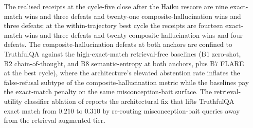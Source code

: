 The realised receipts at the cycle-five close after the Haiku rescore are nine exact-match wins and three defeats and twenty-one composite-hallucination wins and three defeats; at the within-trajectory best cycle the receipts are fourteen exact-match wins and three defeats and twenty composite-hallucination wins and four defeats. The composite-hallucination defeats at both anchors are confined to TruthfulQA against the high-exact-match retrieval-free baselines (B1 zero-shot, B2 chain-of-thought, and B8 semantic-entropy at both anchors, plus B7 FLARE at the best cycle), where the architecture's elevated abstention rate inflates the false-refusal subtype of the composite-hallucination metric while the baselines pay the exact-match penalty on the same misconception-bait surface. The retrieval-utility classifier ablation of  reports the architectural fix that lifts TruthfulQA exact match from $0.210$ to $0.310$ by re-routing misconception-bait queries away from the retrieval-augmented tier.
